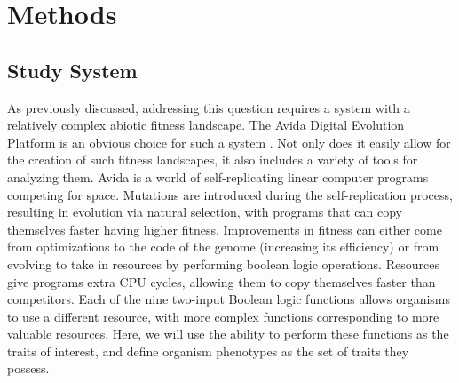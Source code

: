 \section{Methods}

\subsection{Study System}
As previously discussed, addressing this question requires a system with a relatively complex abiotic fitness landscape. The Avida Digital Evolution Platform is an obvious choice for such a system \citep{ofria_avida:_2004}. Not only does it easily allow for the creation of such fitness landscapes, it also includes a variety of tools for analyzing them. Avida is a world of self-replicating linear computer programs competing for space. Mutations are introduced during the self-replication process, resulting in evolution via natural selection, with programs that can copy themselves faster having higher fitness. Improvements in fitness can either come from optimizations to the code of the genome (increasing its efficiency) or from evolving to take in resources by performing boolean logic operations. Resources give programs extra CPU cycles, allowing them to copy themselves faster than competitors. Each of the nine two-input Boolean logic functions allows organisms to use a different resource, with more complex functions corresponding to more valuable resources. Here, we will use the ability to perform these functions as the traits of interest, and define organism phenotypes as the set of traits they possess.

